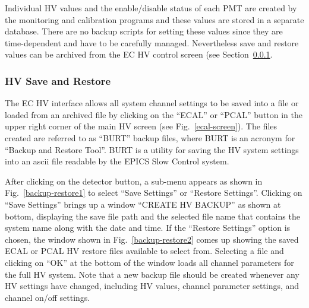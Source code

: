 \documentclass[letterpaper,10pt]{article}
\begin{document}
Individual HV values and the enable/disable status of each PMT are created by the monitoring and
calibration programs and these values are stored in a separate database.  There are no backup scripts for
setting these values since they are time-dependent and have to be carefully managed.  Nevertheless
save and restore values can be archived from the EC HV control screen (see Section~\ref{save-restore}.


\subsubsection{HV Save and Restore}
\label{save-restore}

The EC HV interface allows all system channel settings to be saved into a file or loaded from an
archived file by clicking on the ``ECAL'' or ``PCAL'' button in the upper right corner of the main HV
screen (see Fig.~\ref{ecal-screen}). The files created are referred to as ``BURT'' backup files,
where BURT is an acronym for ``Backup and Restore Tool''. BURT is a utility for saving the HV system
settings into an ascii file readable by the EPICS Slow Control system.

After clicking on the detector button, a sub-menu appears as shown in Fig.~\ref{backup-restore1}
to select ``Save Settings'' or ``Restore Settings''. Clicking on ``Save Settings'' brings up a window
``CREATE HV BACKUP'' as shown at bottom,  displaying the save file path and the selected
file name that contains the system name along with the date and time. If the ``Restore Settings'' option
is chosen, the window shown in Fig.~\ref{backup-restore2} comes up showing the saved ECAL or PCAL  HV restore
files available to select from. Selecting a file and clicking on ``OK'' at the bottom of the window
loads all channel parameters for the full HV system. Note that a new backup file should be created 
whenever any HV settings have changed, including HV values, channel parameter settings, and channel 
on/off settings.
\end{document}
